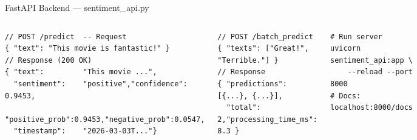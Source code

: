 \documentclass[aspectratio=169,10pt]{beamer}
\begin{document}
\begin{frame}[fragile]{FastAPI Backend --- sentiment\_api.py}
\begin{columns}[T]
  \vspace{-0.4cm}
  \begin{tcolorbox}[codebox]
  \begin{lstlisting}[style=json, numbers=none]
// POST /predict  -- Request
{ "text": "This movie is fantastic!" }
// Response (200 OK)
{ "text":         "This movie ...",
  "sentiment":    "positive","confidence":   0.9453,
  "positive_prob":0.9453,"negative_prob":0.0547,
  "timestamp":    "2026-03-03T..."}
  \end{lstlisting}
  \end{tcolorbox}

  \vspace{-0.15cm}
  \begin{tcolorbox}[codebox]
  \begin{lstlisting}[style=json, numbers=none]
// POST /batch_predict
{ "texts": ["Great!", "Terrible."] }
// Response
{ "predictions": [{...}, {...}],
  "total": 2,"processing_time_ms": 8.3 }
  \end{lstlisting}
  \end{tcolorbox}

  \vspace{-0.5cm}
  \begin{tcolorbox}[codebox]
  \begin{lstlisting}[style=py, numbers=none]
# Run server
uvicorn sentiment_api:app \
    --reload --port 8000
# Docs: localhost:8000/docs
  \end{lstlisting}
  \end{tcolorbox}
\end{columns}
\end{frame}
\end{document}
